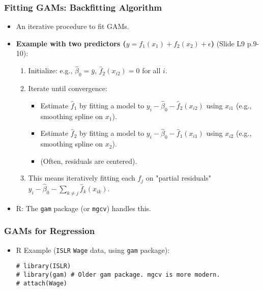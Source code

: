 \documentclass[12pt,a4paper]{article}
\newcommand{\Rpackage}[1]{\texttt{#1}} %
\newcommand{\Robject}[1]{\texttt{#1}} %
\begin{document}
\begin{itemize}
    \subsubsection{Fitting GAMs: Backfitting Algorithm }
        \begin{itemize}
            \item An iterative procedure to fit GAMs.
            \item \textbf{Example with two predictors ($y = f_1(x_1) + f_2(x_2) + \epsilon$)} (Slide L9 p.9-10):
                \begin{enumerate}
                    \item Initialize: e.g., $\hat{\beta}_0 = \bar{y}$, $\hat{f}_2(x_{i2}) = 0$ for all $i$.
                    \item Iterate until convergence:
                        \begin{itemize}
                            \item Estimate $\hat{f}_1$ by fitting a model to $y_i - \hat{\beta}_0 - \hat{f}_2(x_{i2})$ using $x_{i1}$ (e.g., smoothing spline on $x_1$).
                            \item Estimate $\hat{f}_2$ by fitting a model to $y_i - \hat{\beta}_0 - \hat{f}_1(x_{i1})$ using $x_{i2}$ (e.g., smoothing spline on $x_2$).
                            \item (Often, residuals are centered).
                        \end{itemize}
                    \item This means iteratively fitting each $f_j$ on "partial residuals" $y_i - \hat{\beta}_0 - \sum_{k \neq j} \hat{f}_k(x_{ik})$.
                \end{enumerate}
            \item R: The \Rpackage{gam} package (or \Rpackage{mgcv}) handles this.
        \end{itemize}

    \subsubsection{GAMs for Regression }
        \begin{itemize}
            \item R Example (\Rpackage{ISLR} \Robject{Wage} data, using \Rpackage{gam} package):
\begin{lstlisting}[caption={GAM for Regression with Wage Data (Slide L9 p.11-12)}]
# library(ISLR)
# library(gam) # Older gam package. mgcv is more modern.
# attach(Wage)


\end{lstlisting}
\end{itemize}
\end{itemize}
\end{document}
